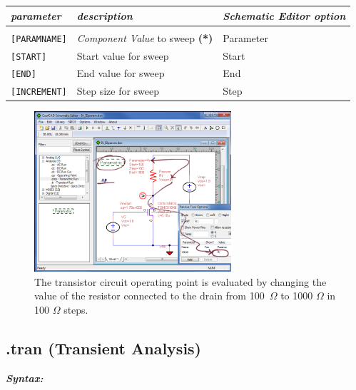 \begin{tabular}{lp{5.5cm}p{5cm}}
\textit{parameter} & \textit{description} & \textit{\textsf{Schematic Editor} option}\\ \hline \\ \vspace{-0.8\parskip}
\texttt{[PARAMNAME]} & \textit{Component Value} to sweep \textbf{(*)} & \textsf{Parameter}\\
\texttt{[START]} & Start value for sweep & \textsf{Start} \\
\texttt{[END]} & End value for sweep & \textsf{End} \\
\texttt{[INCREMENT]} & Step size for sweep & \textsf{Step}
\end{tabular}


\begin{figure}
    \includegraphics[width=0.65\textwidth]{./figures/spice_analysis_figures/SPICEAnalysis_parametric1.png}
    \caption{{The transistor circuit operating point is evaluated by changing the value of the resistor connected to the drain from \mbox{100 $\Omega$} to 1000 $\Omega$ in 100 $\Omega$ steps.}}
  \label{fig_spiceanalysis_paramexample}
\end{figure}

\subsection{.tran (Transient Analysis)}
\label{subsec_satco_tran}

\textbf{\textit{Syntax:}}

